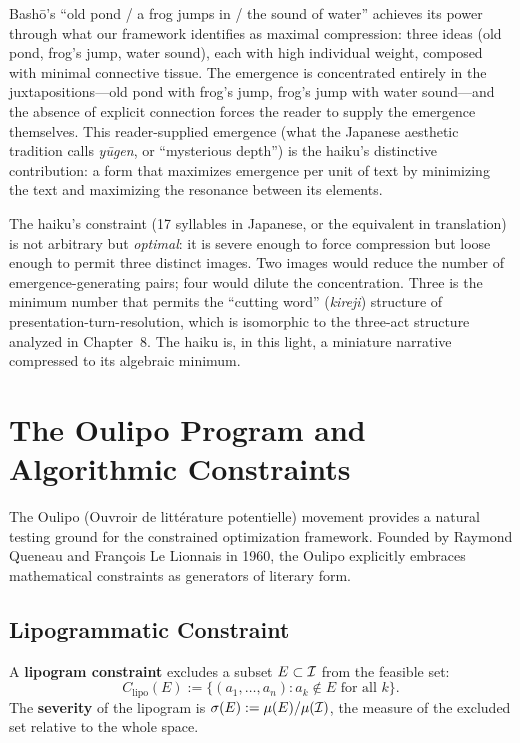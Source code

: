 \begin{remark}[Bash\=o and the Algebra of Juxtaposition]
\label{rem:basho}
Bash\=o's ``old pond / a frog jumps in / the sound of water'' achieves its power through what our framework identifies as maximal compression: three ideas (old pond, frog's jump, water sound), each with high individual weight, composed with minimal connective tissue.  The emergence is concentrated entirely in the juxtapositions---old pond with frog's jump, frog's jump with water sound---and the absence of explicit connection forces the reader to supply the emergence themselves.  This reader-supplied emergence (what the Japanese aesthetic tradition calls \emph{yūgen}, or ``mysterious depth'') is the haiku's distinctive contribution: a form that maximizes emergence per unit of text by minimizing the text and maximizing the resonance between its elements.

The haiku's constraint (17 syllables in Japanese, or the equivalent in translation) is not arbitrary but \emph{optimal}: it is severe enough to force compression but loose enough to permit three distinct images.  Two images would reduce the number of emergence-generating pairs; four would dilute the concentration.  Three is the minimum number that permits the ``cutting word'' (\emph{kireji}) structure of presentation-turn-resolution, which is isomorphic to the three-act structure analyzed in Chapter~8.  The haiku is, in this light, a miniature narrative compressed to its algebraic minimum.
\end{remark}


\section{The Oulipo Program and Algorithmic Constraints}

The Oulipo (Ouvroir de litt\'erature potentielle) movement provides a natural
testing ground for the constrained optimization framework.  Founded by Raymond
Queneau and Fran\c{c}ois Le Lionnais in 1960, the Oulipo explicitly embraces
mathematical constraints as generators of literary form.

\subsection{Lipogrammatic Constraint}

\begin{definition}
\label{def:lipogram}
A \textbf{lipogram constraint} excludes a subset $E \subset \mathcal{I}$ from the
feasible set:
\[
  C_{\text{lipo}}(E) :=
  \{(a_1, \ldots, a_n) : a_k \notin E \text{ for all } k\}.
\]
The \textbf{severity} of the lipogram is $\sigma(E) := \mu(E) / \mu(\mathcal{I})$,
the measure of the excluded set relative to the whole space.
\end{definition}

